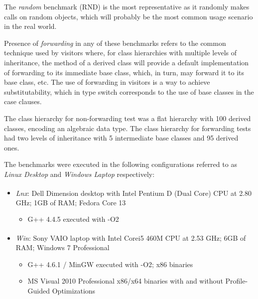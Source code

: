 The \emph{random} benchmark (RND) is the most representative as it randomly makes calls on 
random objects, which will probably be the most common usage scenario in the 
real world.

Presence of \emph{forwarding} in any of these benchmarks refers to the 
common technique used by visitors where, for class hierarchies with multiple 
levels of inheritance, the  method of a derived class will provide a 
default implementation of forwarding to its immediate base class, which, in turn, 
may forward it to its base class, etc. The use of forwarding in visitors is a 
way to achieve substitutability, which in type switch corresponds to the use 
of base classes in the case clauses.

The class hierarchy for non-forwarding test was a flat hierarchy with 100 
derived classes, encoding an algebraic data type. The class hierarchy for 
forwarding tests had two levels of inheritance with 5 intermediate base classes 
and 95 derived ones. 

The benchmarks were executed in the following configurations referred to as 
\emph{Linux Desktop} and \emph{Windows Laptop} respectively:

\begin{itemize}
\setlength{\itemsep}{0pt}
\setlength{\parskip}{0pt}
\item \emph{Lnx}: Dell Dimension\textsuperscript{\textregistered} desktop with Intel\textsuperscript{\textregistered} Pentium\textsuperscript{\textregistered} 
      D (Dual Core) CPU at 2.80 GHz; 1GB of RAM; Fedora Core 13  
      \begin{itemize}
      \setlength{\itemsep}{0pt}
      \setlength{\parskip}{0pt}
      \item G++ 4.4.5 executed with -O2
      \end{itemize}
\item \emph{Win}: Sony VAIO\textsuperscript{\textregistered} laptop with Intel\textsuperscript{\textregistered} Core\texttrademark i5 460M 
      CPU at 2.53 GHz; 6GB of RAM; Windows 7 Professional
      \begin{itemize}
      \setlength{\itemsep}{0pt}
      \setlength{\parskip}{0pt}
      \item G++ 4.6.1 / MinGW executed with -O2; x86 binaries
      \item MS Visual \Cpp{} 2010 Professional x86/x64 binaries with and without 
      Profile-Guided Optimizations
      \end{itemize}
\end{itemize}

